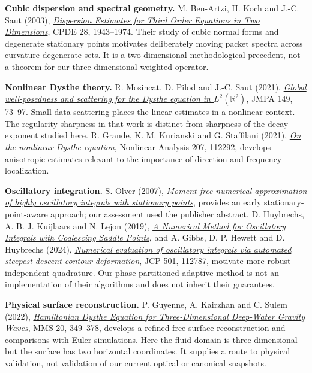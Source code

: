 \documentclass[10pt,letterpaper]{article}
\begin{document}
\textbf{Cubic dispersion and spectral geometry.} M. Ben-Artzi, H. Koch and
J.-C. Saut (2003), \href{https://doi.org/10.1081/PDE-120025491}{\emph{Dispersion Estimates
for Third Order Equations in Two Dimensions}}, CPDE 28, 1943--1974. Their study of
cubic normal forms and degenerate stationary points motivates deliberately moving
packet spectra across curvature-degenerate sets. It is a two-dimensional methodological
precedent, not a theorem for our three-dimensional weighted operator.

\textbf{Nonlinear Dysthe theory.} R. Mosincat, D. Pilod and J.-C. Saut (2021),
\href{https://arxiv.org/abs/2007.01613}{\emph{Global well-posedness and scattering for
the Dysthe equation in $L^2(\mathbb R^2)$}}, JMPA 149, 73--97. Small-data scattering
places the linear estimates in a nonlinear context. The regularity sharpness in
that work is distinct from sharpness of the decay exponent studied here.
R. Grande, K. M. Kurianski and G. Staffilani (2021),
\href{https://arxiv.org/abs/2006.13392}{\emph{On the nonlinear Dysthe equation}},
Nonlinear Analysis 207, 112292, develops anisotropic estimates relevant to the
importance of direction and frequency localization.

\textbf{Oscillatory integration.} S. Olver (2007),
\href{https://www.cambridge.org/core/journals/european-journal-of-applied-mathematics/article/abs/momentfree-numerical-approximation-of-highly-oscillatory-integrals-with-stationary-points/0E02A1874E775BB219E5A2CE2DC0221B}{\emph{Moment-free numerical approximation of highly oscillatory integrals with stationary points}},
provides an early stationary-point-aware approach; our assessment used the publisher abstract.
D. Huybrechs, A. B. J. Kuijlaars and N. Lejon (2019),
\href{https://arxiv.org/abs/1806.06549}{\emph{A Numerical Method for Oscillatory Integrals
with Coalescing Saddle Points}}, and A. Gibbs, D. P. Hewett and D. Huybrechs (2024),
\href{https://arxiv.org/abs/2307.07261}{\emph{Numerical evaluation of oscillatory integrals
via automated steepest descent contour deformation}}, JCP 501, 112787, motivate
more robust independent quadrature. Our phase-partitioned adaptive method is not
an implementation of their algorithms and does not inherit their guarantees.

\textbf{Physical surface reconstruction.} P. Guyenne, A. Kairzhan and C. Sulem
(2022), \href{https://doi.org/10.1137/21M1432788}{\emph{Hamiltonian Dysthe Equation for
Three-Dimensional Deep-Water Gravity Waves}}, MMS 20, 349--378, develops a refined
free-surface reconstruction and comparisons with Euler simulations. Here the
fluid domain is three-dimensional but the surface has two horizontal coordinates.
It supplies a route to physical validation, not validation of our current optical
or canonical snapshots.
\end{document}
